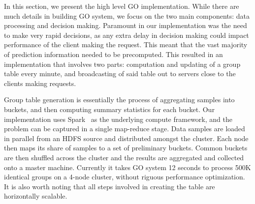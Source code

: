 \label{sec:impl}

In this section, we present the high level GO implementation. While there are much details in building GO system, we focus on the two main components: data processing and decision making. Paramount in our implementation was the need to make very rapid decisions, as any extra delay in decision making could impact performance of the client making the request. This meant that the vast majority of prediction information needed to be precomputed. This resulted in an implementation that involves two parts: computation and updating of a group table every minute, and broadcasting of said table out to servers close to the clients making requests.



 Group table generation is essentially the process of aggregating samples into buckets, and then computing summary statistics for each bucket.  
Our implementation uses Spark~\cite{} as the underlying compute framework, and the problem can be captured in a single map-reduce stage. 
Data samples are loaded in parallel from an HDFS source and distributed amongst the cluster. Each node then maps its share of samples to a set of 
preliminary buckets. Common buckets are then shuffled across the cluster and the results are aggregated and collected onto a master machine. 
Currently it takes GO system 12 seconds to process 500K identical groups on a 4-node cluster, without riguous performance optimization.
It is also worth noting that all steps involved in creating the table are horizontally scalable.

